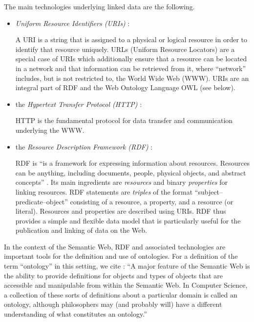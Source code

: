 The main technologies underlying linked data are the following.
%
\begin{itemize}
  \item
    \emph{Uniform Resource Identifiers (URIs)} \autocite{RFC3986}:
    
    \par
    A URI is a string that is assigned to a physical or logical resource
    in order to identify that resource uniquely. URLs (Uniform Resource Locators)
    are a special case of URIs which additionally ensure that a resource
    can be located in a network and that information can be retrieved from it,
    where \enquote{network} includes, but is not restricted to, the World Wide Web (WWW).
    URIs are an integral part of RDF and the Web Ontology Language OWL (see below).
  \item
    the \emph{Hypertext Transfer Protocol (HTTP)} \autocite{HTTP}:
    
    \par
    HTTP is the fundamental protocol for data transfer and communication underlying the WWW.
  \item
    the \emph{Resource Description Framework (RDF)} \autocite{RDFPrimer}:
    
    \par
    RDF is \enquote{is a framework for expressing information about resources. Resources can be anything, including documents, people, physical objects, and abstract concepts}
    \autocite{RDFPrimer}.
    Its main ingredients are \emph{resources} and binary \emph{properties} for linking resources.
    RDF statements are \emph{triples} of the format \enquote{subject--predicate--object}
    consisting of a resource, a property, and a resource (or literal).
    Resources and properties are described using URIs.
    RDF thus provides a simple and flexible data model that is particularly useful for the publication
    and linking of data on the Web.
\end{itemize}
%
In the context of the Semantic Web, RDF and associated technologies
are important tools for the definition and use of ontologies.
For a definition of the term \enquote{ontology} in this setting, we cite \textcite{Horrocks2011}:
\enquote{A major feature of the Semantic Web is the ability to provide definitions for objects and types of objects that are accessible and manipulable from within the Semantic Web. In Computer Science, a collection of these sorts of definitions about a particular domain is called an ontology, although philosophers may (and probably will) have a different understanding of what constitutes an ontology.}

